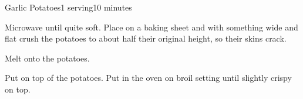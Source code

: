 \documentclass[../Cookbook.tex]{subfiles}
\begin{document}
\begin{recipe}[GarlicPotatoes]{Garlic Potatoes}{1 serving}{10 minutes}

Microwave until quite soft.
Place on a baking sheet and with something wide and flat crush the potatoes to about half their original height, so their skins crack.

Melt onto the potatoes.

Put on top of the potatoes.
Put in the oven on broil setting until slightly crispy on top.

\end{recipe}
\end{document}
